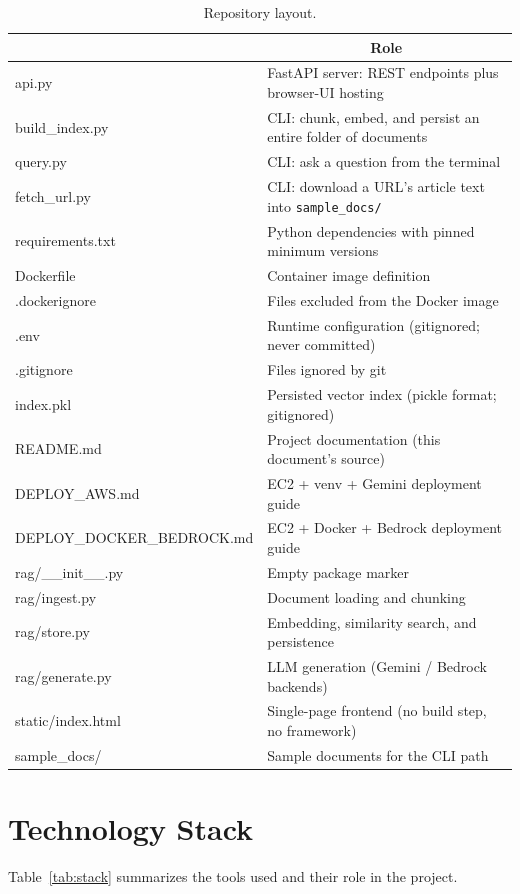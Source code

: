 \documentclass[11pt,a4paper]{article}
\begin{document}
\begin{table}[h]
\centering
\small
\begin{tabular}{>{\ttfamily}p{4.4cm} p{10.4cm}}
\toprule
\multicolumn{1}{>{\rmfamily}p{4.4cm}}{\textbf{File}} &
\multicolumn{1}{c}{\textbf{Role}} \\
\midrule
api.py            & FastAPI server: REST endpoints plus browser-UI hosting \\
build\_index.py   & CLI: chunk, embed, and persist an entire folder of documents \\
query.py          & CLI: ask a question from the terminal \\
fetch\_url.py     & CLI: download a URL's article text into \texttt{sample\_docs/} \\
requirements.txt  & Python dependencies with pinned minimum versions \\
Dockerfile        & Container image definition \\
.dockerignore     & Files excluded from the Docker image \\
.env              & Runtime configuration (gitignored; never committed) \\
.gitignore        & Files ignored by git \\
index.pkl         & Persisted vector index (pickle format; gitignored) \\
README.md         & Project documentation (this document's source) \\
DEPLOY\_AWS.md    & EC2 + venv + Gemini deployment guide \\
DEPLOY\_DOCKER\_BEDROCK.md & EC2 + Docker + Bedrock deployment guide \\
rag/\_\_init\_\_.py & Empty package marker \\
rag/ingest.py     & Document loading and chunking \\
rag/store.py      & Embedding, similarity search, and persistence \\
rag/generate.py   & LLM generation (Gemini / Bedrock backends) \\
static/index.html & Single-page frontend (no build step, no framework) \\
sample\_docs/     & Sample documents for the CLI path \\
\bottomrule
\end{tabular}
\caption{Repository layout.}
\label{tab:repo}
\end{table}

\section{Technology Stack}
Table~\ref{tab:stack} summarizes the tools used and their role in the
project.
\end{document}
